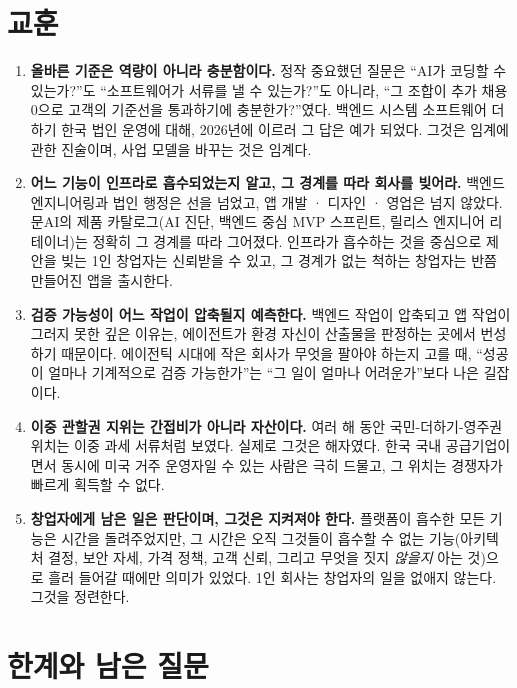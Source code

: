 \documentclass{article}
\begin{document}
\section{교훈}

\begin{enumerate}
    \item \textbf{올바른 기준은 역량이 아니라 충분함이다.} 정작 중요했던 질문은 ``AI가 코딩할 수 있는가?''도 ``소프트웨어가 서류를 낼 수 있는가?''도 아니라, ``그 조합이 추가 채용 0으로 고객의 기준선을 통과하기에 충분한가?''였다. 백엔드 시스템 소프트웨어 더하기 한국 법인 운영에 대해, 2026년에 이르러 그 답은 예가 되었다. 그것은 임계에 관한 진술이며, 사업 모델을 바꾸는 것은 임계다.
    \item \textbf{어느 기능이 인프라로 흡수되었는지 알고, 그 경계를 따라 회사를 빚어라.} 백엔드 엔지니어링과 법인 행정은 선을 넘었고, 앱 개발 · 디자인 · 영업은 넘지 않았다. 문AI의 제품 카탈로그(AI 진단, 백엔드 중심 MVP 스프린트, 릴리스 엔지니어 리테이너)는 정확히 그 경계를 따라 그어졌다. 인프라가 흡수하는 것을 중심으로 제안을 빚는 1인 창업자는 신뢰받을 수 있고, 그 경계가 없는 척하는 창업자는 반쯤 만들어진 앱을 출시한다.
    \item \textbf{검증 가능성이 어느 작업이 압축될지 예측한다.} 백엔드 작업이 압축되고 앱 작업이 그러지 못한 깊은 이유는, 에이전트가 환경 자신이 산출물을 판정하는 곳에서 번성하기 때문이다. 에이전틱 시대에 작은 회사가 무엇을 팔아야 하는지 고를 때, ``성공이 얼마나 기계적으로 검증 가능한가''는 ``그 일이 얼마나 어려운가''보다 나은 길잡이다.
    \item \textbf{이중 관할권 지위는 간접비가 아니라 자산이다.} 여러 해 동안 국민-더하기-영주권 위치는 이중 과세 서류처럼 보였다. 실제로 그것은 해자였다. 한국 국내 공급기업이면서 동시에 미국 거주 운영자일 수 있는 사람은 극히 드물고, 그 위치는 경쟁자가 빠르게 획득할 수 없다.
    \item \textbf{창업자에게 남은 일은 판단이며, 그것은 지켜져야 한다.} 플랫폼이 흡수한 모든 기능은 시간을 돌려주었지만, 그 시간은 오직 그것들이 흡수할 수 없는 기능(아키텍처 결정, 보안 자세, 가격 정책, 고객 신뢰, 그리고 무엇을 짓지 \emph{않을지} 아는 것)으로 흘러 들어갈 때에만 의미가 있었다. 1인 회사는 창업자의 일을 없애지 않는다. 그것을 정련한다.
\end{enumerate}

\section{한계와 남은 질문}
\end{document}
